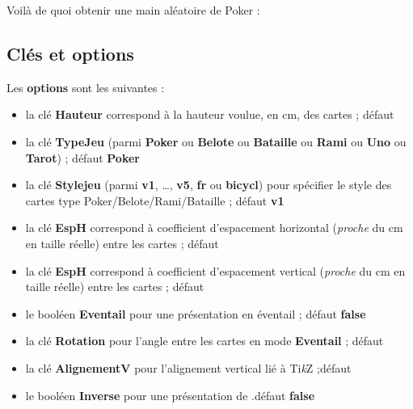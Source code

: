 \documentclass[a4paper]{article}
\providecommand\tikzlogo{Ti\textit{k}Z}
\let\TikZ\tikzlogo
\newcommand\cmaj[1]{\tcbox[vignetteMaJ]{#1}\xspace}
\newcommand\Cle[1]{{\bfseries\sffamily\textlangle #1\textrangle}}
\begin{document}
{{{{{{{{{{{\begin{codetex}
\end{codetex}

\begin{codetex}[]
Voilà de quoi obtenir une main aléatoire de Poker :

\end{codetex}

\subsection{Clés et options}

\begin{codecles}
Les \Cle{options} sont les suivantes :

\begin{itemize}
	\item la clé \Cle{Hauteur} correspond à la hauteur voulue, en cm, des cartes ; \hfill{}défaut \Cle{4.25}
	\item la clé \Cle{TypeJeu} (parmi \Cle{Poker} ou \Cle{Belote} ou \Cle{Bataille} ou \Cle{Rami} ou \Cle{Uno} ou \Cle{Tarot}) ; \hfill{}défaut \Cle{Poker}
	\item \cmaj{0.2.4} la clé \Cle{Stylejeu} (parmi \Cle{v1}, \ldots, \Cle{v5}, \Cle{fr} ou \Cle{bicycl}) pour spécifier le style des cartes type \textsf{Poker/Belote/Rami/Bataille} ; \hfill{}défaut \Cle{v1}
	\item la clé \Cle{EspH} correspond à coefficient d'espacement horizontal (\textit{proche} du cm en taille réelle) entre les cartes ; \hfill{}défaut \Cle{1}
	\item la clé \Cle{EspH} correspond à coefficient d'espacement vertical (\textit{proche} du cm en taille réelle) entre les cartes ; \hfill{}défaut \Cle{0}
	\item le booléen \Cle{Eventail} pour une présentation en éventail ; \hfill{}défaut \Cle{false}
	\item la clé \Cle{Rotation} pour l'angle entre les cartes en mode \Cle{Eventail}  ; \hfill{}défaut \Cle{10}
	\item la clé \Cle{AlignementV} pour l'alignement vertical lié à \TikZ{} ;\hfill{}défaut \Cle{0.5}
	\item le booléen \Cle{Inverse} pour une présentation de .\hfill{}défaut \Cle{false}
\end{itemize}
\end{codecles}

}}}}}}}}}}}
\end{document}
